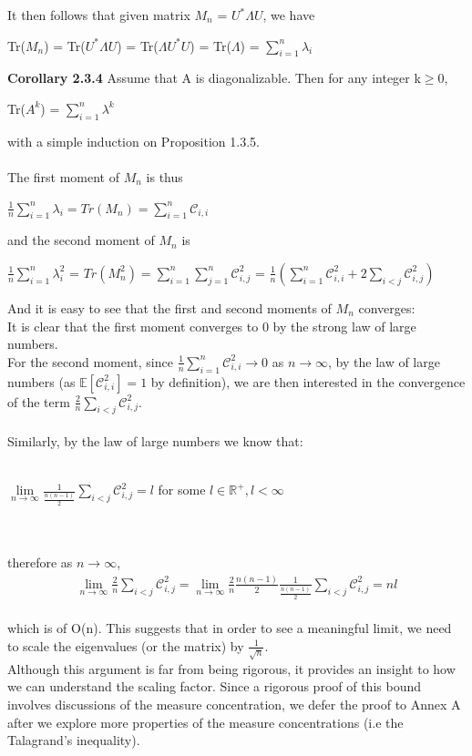 \documentclass{article}
\begin{document}
It then follows that given matrix $M_n$ = $U^*\Lambda U$, we have
\begin{center}
    Tr($M_n$) = Tr($U^* \Lambda U$) = Tr($\Lambda U^*U$) = Tr($\Lambda$) = $\sum\limits_{i = 1}^n \lambda_i$
\end{center}
\textbf{Corollary 2.3.4} Assume that A is diagonalizable. Then for any integer k$\geq$0,
\begin{center}
    Tr($A^k$) = $\sum\limits_{i = 1}^n \lambda^k$
\end{center}
with a simple induction on Proposition 1.3.5.
\\
\\
The first moment of $M_n$ is thus
\begin{center}
    $\frac{1}{n} \sum\limits_{i = 1}^n \lambda_i = Tr(M_n) = \sum\limits_{i = 1}^n \mathcal{C}_{i,i}$
\end{center}
and the second moment of $M_n$ is
\begin{center}
    $\frac{1}{n} \sum\limits_{i = 1}^n \lambda_i^2$ = $Tr(M_n ^ 2)= \sum\limits_{i = 1}^n \sum\limits_{j = 1}^n \mathcal{C}_{i,j}^2$ = $\frac{1}{n} (\sum\limits_{i = 1}^n \mathcal{C}_{i,i}^2 + 2\sum\limits_{i < j}\mathcal{C}_{i, j}^2)$
\end{center}
And it is easy to see that the first and second moments of $M_n$ converges: \\
It is clear that the first moment converges to 0 by the strong law of large numbers.\\
For the second moment, since $\frac{1}{n} \sum\limits_{i = 1}^n \mathcal{C}_{i,i}^2 \rightarrow 0$ as $n \rightarrow \infty$, by the law of large numbers (as $\mathbb{E} [\mathcal{C}_{i,i} ^ 2] = 1$ by definition), we are then interested in the convergence of the term $\frac{2}{n}\sum\limits_{i < j}\mathcal{C}_{i, j}^2$.\\
\\
Similarly, by the law of large numbers we know that: \\
\\
\centerline{$\lim\limits_{n \rightarrow \infty}\frac{1}{\frac{n(n - 1)}{2}}\sum\limits_{i < j}\mathcal{C}_{i, j}^2 = l$ for some $l \in \mathbb{R}^+, l < \infty$}
\\
\\
therefore as $n \rightarrow \infty$,\\
\begin{align*}
    \lim\limits_{n \rightarrow \infty}\frac{2}{n}\sum\limits_{i < j}\mathcal{C}_{i, j}^2 = \lim\limits_{n \rightarrow \infty}\frac{2}{n} \frac{n (n-1)}{2} \frac{1}{\frac{n (n-1)}{2}}\sum\limits_{i < j}\mathcal{C}_{i, j}^2 = n l
\end{align*}
\\
which is of O(n). This suggests that in order to see a meaningful limit, we need to scale the eigenvalues (or the matrix) by $\frac{1}{\sqrt{n}}$.\\
Although this argument is far from being rigorous, it provides an insight to how we can understand the scaling factor. Since a rigorous proof of this bound involves discussions of the measure concentration, we defer the proof to Annex A after we explore more properties of the measure concentrations (i.e the Talagrand's inequality).
\end{document}
